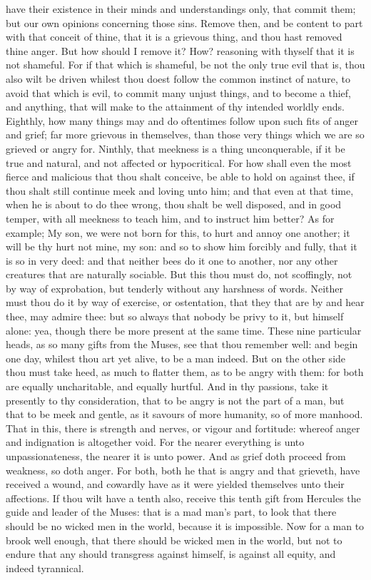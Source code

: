 have their existence in their minds and understandings only, that commit
them; but our own opinions concerning those sins. Remove then, and be
content to part with that conceit of thine, that it is a grievous thing,
and thou hast removed thine anger. But how should I remove it? How?
reasoning with thyself that it is not shameful. For if that which is
shameful, be not the only true evil that is, thou also wilt be driven
whilest thou doest follow the common instinct of nature, to avoid that
which is evil, to commit many unjust things, and to become a thief, and
anything, that will make to the attainment of thy intended worldly ends.
Eighthly, how many things may and do oftentimes follow upon such fits of
anger and grief; far more grievous in themselves, than those very things
which we are so grieved or angry for. Ninthly, that meekness is a thing
unconquerable, if it be true and natural, and not affected or
hypocritical. For how shall even the most fierce and malicious that thou
shalt conceive, be able to hold on against thee, if thou shalt still
continue meek and loving unto him; and that even at that time, when he is
about to do thee wrong, thou shalt be well disposed, and in good temper,
with all meekness to teach him, and to instruct him better? As for
example; My son, we were not born for this, to hurt and annoy one another;
it will be thy hurt not mine, my son: and so to show him forcibly and
fully, that it is so in very deed: and that neither bees do it one to
another, nor any other creatures that are naturally sociable. But this
thou must do, not scoffingly, not by way of exprobation, but tenderly
without any harshness of words. Neither must thou do it by way of
exercise, or ostentation, that they that are by and hear thee, may admire
thee: but so always that nobody be privy to it, but himself alone: yea,
though there be more present at the same time. These nine particular
heads, as so many gifts from the Muses, see that thou remember well: and
begin one day, whilest thou art yet alive, to be a man indeed. But on the
other side thou must take heed, as much to flatter them, as to be angry
with them: for both are equally uncharitable, and equally hurtful. And in
thy passions, take it presently to thy consideration, that to be angry is
not the part of a man, but that to be meek and gentle, as it savours of
more humanity, so of more manhood. That in this, there is strength and
nerves, or vigour and fortitude: whereof anger and indignation is
altogether void. For the nearer everything is unto unpassionateness, the
nearer it is unto power. And as grief doth proceed from weakness, so doth
anger. For both, both he that is angry and that grieveth, have received a
wound, and cowardly have as it were yielded themselves unto their
affections. If thou wilt have a tenth also, receive this tenth gift from
Hercules the guide and leader of the Muses: that is a mad man's part, to
look that there should be no wicked men in the world, because it is
impossible. Now for a man to brook well enough, that there should be
wicked men in the world, but not to endure that any should transgress
against himself, is against all equity, and indeed tyrannical.

